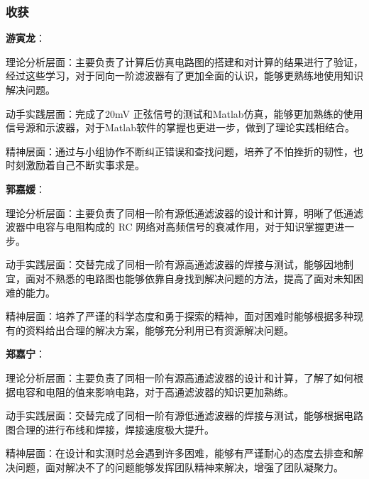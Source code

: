 \documentclass[./测控三级项目.tex]{subfiles} %
\begin{document}
		\subsubsection{收获}
			\textbf{游寅龙}：\par
			理论分析层面：主要负责了计算后仿真电路图的搭建和对计算的结果进行了验证，经过这些学习，对于同向一阶滤波器有了更加全面的认识，能够更熟练地使用知识解决问题。\par
			动手实践层面：完成了20mV 正弦信号的测试和Matlab仿真，能够更加熟练的使用信号源和示波器，对于Matlab软件的掌握也更进一步，做到了理论实践相结合。\par
			精神层面：通过与小组协作不断纠正错误和查找问题，培养了不怕挫折的韧性，也时刻激励着自己不断实事求是。\par
			\textbf{郭嘉媛}：\par
			理论分析层面：主要负责了同相一阶有源低通滤波器的设计和计算，明晰了低通滤波器中电容与电阻构成的 RC 网络对高频信号的衰减作用，对于知识掌握更进一步。\par
			动手实践层面：交替完成了同相一阶有源高通滤波器的焊接与测试，能够因地制宜，面对不熟悉的电路图也能够依靠自身找到解决问题的方法，提高了面对未知困难的能力。\par
			精神层面：培养了严谨的科学态度和勇于探索的精神，面对困难时能够根据多种现有的资料给出合理的解决方案，能够充分利用已有资源解决问题。\par
			\textbf{郑嘉宁}：\par
			理论分析层面：主要负责了同相一阶有源高通滤波器的设计和计算，了解了如何根据电容和电阻的值来影响电路，对于高通滤波器的知识更加熟练。\par
			动手实践层面：交替完成了同相一阶有源低通滤波器的焊接与测试，能够根据电路图合理的进行布线和焊接，焊接速度极大提升。\par
			精神层面：在设计和实测时总会遇到许多困难，能够有严谨耐心的态度去排查和解决问题，面对解决不了的问题能够发挥团队精神来解决，增强了团队凝聚力。
\end{document}
